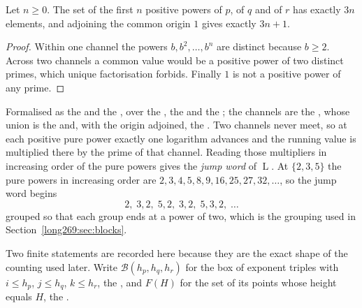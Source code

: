 \documentclass[11pt]{article}
\newcommand{\Lprefix}{\operatorname{L}}
\begin{document}
\begin{proposition}\label{long269:res:count}
Let $n\ge0$.  The set of the first $n$ positive powers of $p$, of $q$ and of
$r$ has exactly $3n$ elements, and adjoining the common origin $1$ gives
exactly $3n+1$.
\end{proposition}

\begin{proof}
Within one channel the powers $b,b^{2},\ldots,b^{n}$ are distinct because
$b\ge2$.  Across two channels a common value would be a positive power of two
distinct primes, which unique factorisation forbids.  Finally $1$ is not a
positive power of any prime.
\end{proof}

\noindent Formalised as the
 and the
, over the
, the
 and the
; the channels are the
, whose union is the
 and, with the origin adjoined, the
.  Two channels never meet, so at each positive pure power exactly
one logarithm advances and the running value is multiplied there by the prime
of that channel.  Reading those multipliers in increasing order of the pure
powers gives the \emph{jump word} of $\Lprefix$.  At $\{2,3,5\}$ the pure
powers in increasing order are $2,3,4,5,8,9,16,25,27,32,\ldots$, so the jump
word begins
\[
 2,\;3,2,\;5,2,\;3,2,\;5,3,2,\;\ldots
\]
grouped so that each group ends at a power of two, which is the grouping used
in Section~\ref{long269:sec:blocks}.

Two finite statements are recorded here because they are the exact shape of the
counting used later.  Write $\mathcal B(h_p,h_q,h_r)$ for the box of exponent
triples with $i\le h_p$, $j\le h_q$, $k\le h_r$, the
, and $F(H)$ for the set of its points whose height equals $H$, the
.
\end{document}
